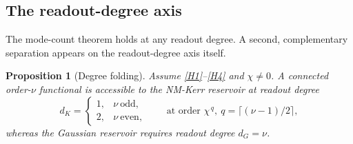 \documentclass[11pt]{article}
\newtheorem{proposition}{Proposition}
\theoremstyle{remark}
\begin{document}
\subsection{The readout-degree axis}
\label{sec:scaling-degree}

The mode-count theorem holds at any readout degree. A second, complementary
separation appears on the readout-degree axis itself.

\begin{proposition}[Degree folding]
\label{prop:degree}
Assume \ref{H1}--\ref{H4} and $\chi\neq0$. A connected order-$\nu$ functional is
accessible to the NM-Kerr reservoir at readout degree
\[
d_K = \begin{cases} 1, & \nu\ \text{odd},\\ 2, & \nu\ \text{even},\end{cases}
\qquad\text{at order }\chi^{\,q},\ q=\big\lceil(\nu-1)/2\big\rceil,
\]
whereas the Gaussian reservoir requires readout degree $d_G=\nu$.
\end{proposition}
\end{document}
